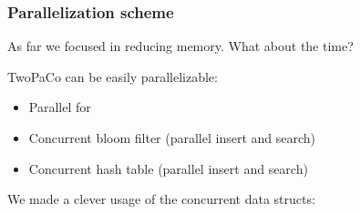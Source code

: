 \begin{frame}
	\frametitle{Parallelization scheme}
	\centering
	
	As far we focused in reducing memory. What about the time?
	
	\medskip
	
	TwoPaCo can be easily parallelizable:
	
	\begin{itemize}
	  \item Parallel for
	  \item Concurrent bloom filter (parallel insert and search)
	  \item Concurrent hash table (parallel insert and search)
	\end{itemize}
	
	We made a clever usage of the concurrent data structs:
	
	
	
	
\end{frame}
